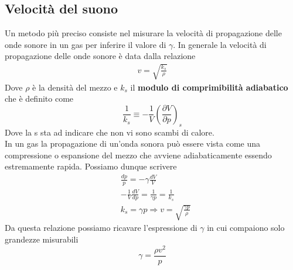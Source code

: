 \documentclass[10pt,a4paper]{article}
\begin{document}
\subsection{Velocità del suono}
Un metodo più preciso consiste nel misurare la velocità di propagazione delle onde sonore
in un gas per inferire il valore di $\gamma$. In generale la velocità di propagazione delle onde sonore è data dalla relazione
\begin{align*}
	v = \sqrt{\frac{k_s}{\rho}}
\end{align*}
Dove $\rho$ è la densità del mezzo e $k_s$ il \textbf{modulo di comprimibilità adiabatico} che è definito come \[\frac{1}{k_s}\equiv -\frac{1}{V}\left(\frac{\partial V}{\partial p}\right)_s\]
Dove la s sta ad indicare che non vi sono scambi di calore.\\ In un gas la propagazione di un'onda sonora può essere vista come una compressione o espansione del mezzo che avviene adiabaticamente essendo estremamente rapida. Possiamo dunque scrivere
\begin{align*}
	&\frac{dp}{p} = -\gamma \frac{dV}{V}\\
	&-\frac{1}{V}\frac{dV}{dp}=\frac{1}{\gamma p} = \frac{1}{k_s}\\
	&k_s = \gamma p \Rightarrow v = \sqrt{\frac{\gamma p}{\rho}}
\end{align*}
Da questa relazione possiamo ricavare l'espressione di $\gamma$ in cui compaiono solo grandezze misurabili \[\gamma =\frac{ \rho v^2}{p}\]
\end{document}
